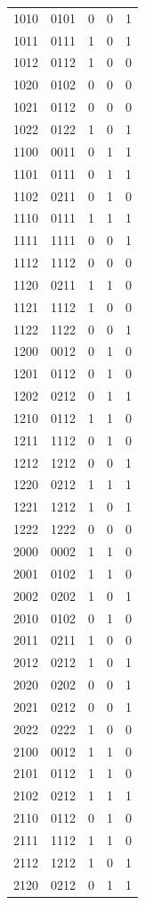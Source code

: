 \documentclass[11pt,a4paper]{article}
\begin{document}
\begin{longtable}{ccccc}
1010 & 0101 & 0 & 0 & 1\\
1011 & 0111 & 1 & 0 & 1\\
1012 & 0112 & 1 & 0 & 0\\
1020 & 0102 & 0 & 0 & 0\\
1021 & 0112 & 0 & 0 & 0\\
1022 & 0122 & 1 & 0 & 1\\
1100 & 0011 & 0 & 1 & 1\\
1101 & 0111 & 0 & 1 & 1\\
1102 & 0211 & 0 & 1 & 0\\
1110 & 0111 & 1 & 1 & 1\\
1111 & 1111 & 0 & 0 & 1\\
1112 & 1112 & 0 & 0 & 0\\
1120 & 0211 & 1 & 1 & 0\\
1121 & 1112 & 1 & 0 & 0\\
1122 & 1122 & 0 & 0 & 1\\
1200 & 0012 & 0 & 1 & 0\\
1201 & 0112 & 0 & 1 & 0\\
1202 & 0212 & 0 & 1 & 1\\
1210 & 0112 & 1 & 1 & 0\\
1211 & 1112 & 0 & 1 & 0\\
1212 & 1212 & 0 & 0 & 1\\
1220 & 0212 & 1 & 1 & 1\\
1221 & 1212 & 1 & 0 & 1\\
1222 & 1222 & 0 & 0 & 0\\
2000 & 0002 & 1 & 1 & 0\\
2001 & 0102 & 1 & 1 & 0\\
2002 & 0202 & 1 & 0 & 1\\
2010 & 0102 & 0 & 1 & 0\\
2011 & 0211 & 1 & 0 & 0\\
2012 & 0212 & 1 & 0 & 1\\
2020 & 0202 & 0 & 0 & 1\\
2021 & 0212 & 0 & 0 & 1\\
2022 & 0222 & 1 & 0 & 0\\
2100 & 0012 & 1 & 1 & 0\\
2101 & 0112 & 1 & 1 & 0\\
2102 & 0212 & 1 & 1 & 1\\
2110 & 0112 & 0 & 1 & 0\\
2111 & 1112 & 1 & 1 & 0\\
2112 & 1212 & 1 & 0 & 1\\
2120 & 0212 & 0 & 1 & 1\\

\end{longtable}
\end{document}
